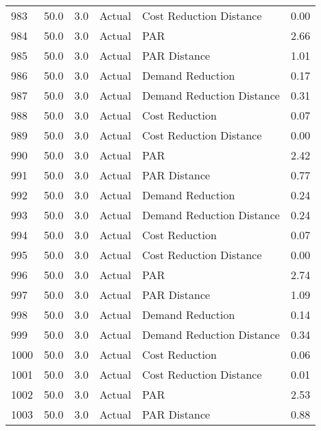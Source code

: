 \begin{longtable}{lrrllr}
983  &         50.0 &     3.0 &         Actual &    Cost Reduction Distance &   0.00 \\
984  &         50.0 &     3.0 &         Actual &                        PAR &   2.66 \\
985  &         50.0 &     3.0 &         Actual &               PAR Distance &   1.01 \\
986  &         50.0 &     3.0 &         Actual &           Demand Reduction &   0.17 \\
987  &         50.0 &     3.0 &         Actual &  Demand Reduction Distance &   0.31 \\
988  &         50.0 &     3.0 &         Actual &             Cost Reduction &   0.07 \\
989  &         50.0 &     3.0 &         Actual &    Cost Reduction Distance &   0.00 \\
990  &         50.0 &     3.0 &         Actual &                        PAR &   2.42 \\
991  &         50.0 &     3.0 &         Actual &               PAR Distance &   0.77 \\
992  &         50.0 &     3.0 &         Actual &           Demand Reduction &   0.24 \\
993  &         50.0 &     3.0 &         Actual &  Demand Reduction Distance &   0.24 \\
994  &         50.0 &     3.0 &         Actual &             Cost Reduction &   0.07 \\
995  &         50.0 &     3.0 &         Actual &    Cost Reduction Distance &   0.00 \\
996  &         50.0 &     3.0 &         Actual &                        PAR &   2.74 \\
997  &         50.0 &     3.0 &         Actual &               PAR Distance &   1.09 \\
998  &         50.0 &     3.0 &         Actual &           Demand Reduction &   0.14 \\
999  &         50.0 &     3.0 &         Actual &  Demand Reduction Distance &   0.34 \\
1000 &         50.0 &     3.0 &         Actual &             Cost Reduction &   0.06 \\
1001 &         50.0 &     3.0 &         Actual &    Cost Reduction Distance &   0.01 \\
1002 &         50.0 &     3.0 &         Actual &                        PAR &   2.53 \\
1003 &         50.0 &     3.0 &         Actual &               PAR Distance &   0.88 \\

\end{longtable}
